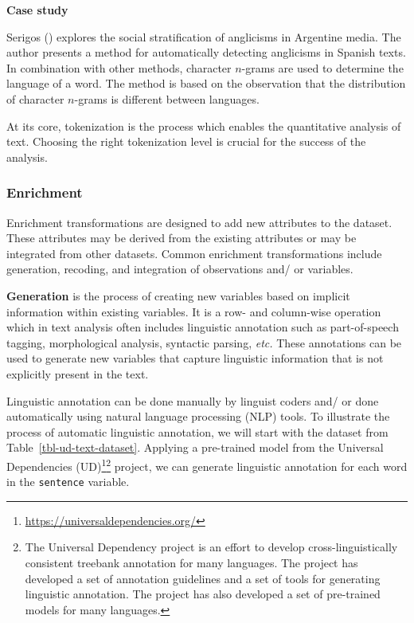 \documentclass[
  letterpaper,
]{latex/krantz}
\theoremstyle{definition}
\theoremstyle{remark}
\DeclareRobustCommand{\href}[2]{#2\footnote{\url{#1}}}
\begin{document}
\begin{tcolorbox}[enhanced jigsaw, breakable, leftrule=.75mm, arc=.35mm, colframe=quarto-callout-color-frame, colback=white, left=2mm, bottomrule=.15mm, rightrule=.15mm, toprule=.15mm, opacityback=0]

\textbf{ Case study}

Serigos () explores the social
stratification of anglicisms in Argentine media. The author presents a
method for automatically detecting anglicisms in Spanish texts. In
combination with other methods, character \(n\)-grams are used to
determine the language of a word. The method is based on the observation
that the distribution of character \(n\)-grams is different between
languages.

\end{tcolorbox}

At its core, tokenization is the process which enables the quantitative
analysis of text. Choosing the right tokenization level is crucial for
the success of the analysis.

\subsubsection{Enrichment}\label{enrichment}

Enrichment transformations are designed to add new attributes to the
dataset. These attributes may be derived from the existing attributes or
may be integrated from other datasets. Common enrichment transformations
include generation, recoding, and integration of observations and/ or
variables.

\textbf{Generation} is the process of creating new variables based on
implicit information within existing variables. It is a row- and
column-wise operation which in text analysis often includes linguistic
annotation such as part-of-speech tagging, morphological analysis,
syntactic parsing, \emph{etc.} These annotations can be used to generate
new variables that capture linguistic information that is not explicitly
present in the text.

Linguistic annotation can be done manually by linguist coders and/ or
done automatically using natural language processing (NLP) tools. To
illustrate the process of automatic linguistic annotation, we will start
with the dataset from Table~\ref{tbl-ud-text-dataset}. Applying a
pre-trained model from the
\href{https://universaldependencies.org/}{Universal Dependencies
(UD)}\footnote{The Universal Dependency project is an effort to develop
  cross-linguistically consistent treebank annotation for many
  languages. The project has developed a set of annotation guidelines
  and a set of tools for generating linguistic annotation. The project
  has also developed a set of pre-trained models for many languages.}
project, we can generate linguistic annotation for each word in the
\texttt{sentence} variable.
\end{document}
